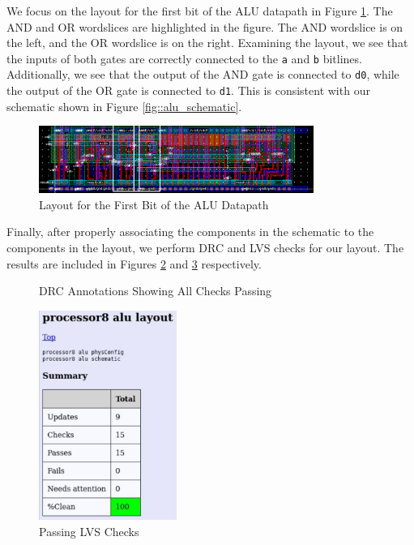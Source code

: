 \documentclass{article}
\begin{document}
	\noindent We focus on the layout for the first bit of the ALU datapath in Figure \ref{fig::alu_layout_bit0}. The AND and OR wordslices are highlighted in the figure. The AND wordslice is on the left, and the OR wordslice is on the right. Examining the layout, we see that the inputs of both gates are correctly connected to the \texttt{a} and \texttt{b} bitlines. Additionally, we see that the output of the AND gate is connected to \texttt{d0}, while the output of the OR gate is connected to \texttt{d1}. This is consistent with our schematic shown in Figure \ref{fig::alu_schematic}.
	
	\begin{figure}[H]
		\centerline{\includegraphics[width=0.8\textwidth]{alu_layout_bit0.png}}
		\caption{Layout for the First Bit of the ALU Datapath}
		\label{fig::alu_layout_bit0}
	\end{figure}
	
	\noindent Finally, after properly associating the components in the schematic to the components in the layout, we perform DRC and LVS checks for our layout. The results are included in Figures \ref{fig::alu_drc} and \ref{fig::alu_lvs} respectively.
	
	\begin{figure}[H]
		\centerline{}
		\caption{DRC Annotations Showing All Checks Passing}
		\label{fig::alu_drc}
	\end{figure}
	
	\begin{figure}[H]
		\centerline{\includegraphics[width=0.4\textwidth]{alu_lvs.png}}
		\caption{Passing LVS Checks}
		\label{fig::alu_lvs}
	\end{figure}
	
\end{document}
